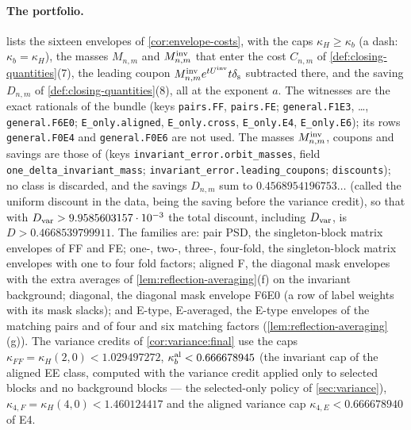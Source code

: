 \paragraph{The portfolio.}
 lists the sixteen envelopes of
\cref{cor:envelope-costs}, with the caps $\kappa_H\ge\kappa_b$ (a dash: $\kappa_b=\kappa_H$),
the masses $M_{n,m}$ and $M^{\rm inv}_{n,m}$ that enter the cost $C_{n,m}$ of
\cref{def:closing-quantities}(7), the leading coupon
$M^{\rm inv}_{n,m}e^{tU^{\mathrm{inv}}}t\delta_{\rm s}$ subtracted there, and the saving $D_{n,m}$
of \cref{def:closing-quantities}(8), all at the exponent $a$. The witnesses are
the exact rationals of the bundle
 (keys
\texttt{pairs.FF}, \texttt{pairs.FE}; \texttt{general.F1E3}, \dots,
\texttt{general.F6E0}; \texttt{E\_only.aligned}, \texttt{E\_only.cross},
\texttt{E\_only.E4}, \texttt{E\_only.E6}); its rows \texttt{general.F0E4} and
\texttt{general.F0E6} are not used. The masses $M^{\rm inv}_{n,m}$, coupons and
savings are those of  (keys
\texttt{invariant\_error.orbit\_masses}, field
\texttt{one\_delta\_invariant\_mass}; \texttt{invariant\_error.leading\_coupons};
\texttt{discounts}); no class is discarded, and the savings
$D_{n,m}$ sum to $0.4568954196753\ldots$ (called the uniform
discount in the data, being the saving before the variance
credit), so that with $D_{\rm var}>9.9585603157\cdot10^{-3}$
the total discount, including $D_{\rm var}$, is
$D>0.4668539799911$. The families are: pair PSD, the singleton-block
matrix envelopes of FF and FE; one-, two-, three-, four-fold, the
singleton-block matrix envelopes with one to four fold factors; aligned F, the
diagonal mask envelopes with the extra averages of
\cref{lem:reflection-averaging}(f) on the invariant background; diagonal, the
diagonal mask envelope F6E0 (a row of label weights with its mask slacks); and
E-type, E-averaged, the E-type envelopes of the matching pairs and of four and
six matching factors (\cref{lem:reflection-averaging}(g)). The variance credits
of \cref{cor:variance:final} use the caps $\kappa_{FF}=\kappa_H(2,0)<1.029497272$,
$\kappa^{\rm al}_b<0.666678945$ (the invariant cap of the
aligned EE class, computed with the variance credit applied
only to selected blocks and no background blocks --- the
selected-only policy of \cref{sec:variance}),
$\kappa_{4,F}=\kappa_H(4,0)<1.460124417$ and the
aligned variance cap $\kappa_{4,E}<0.666678940$ of E4.

